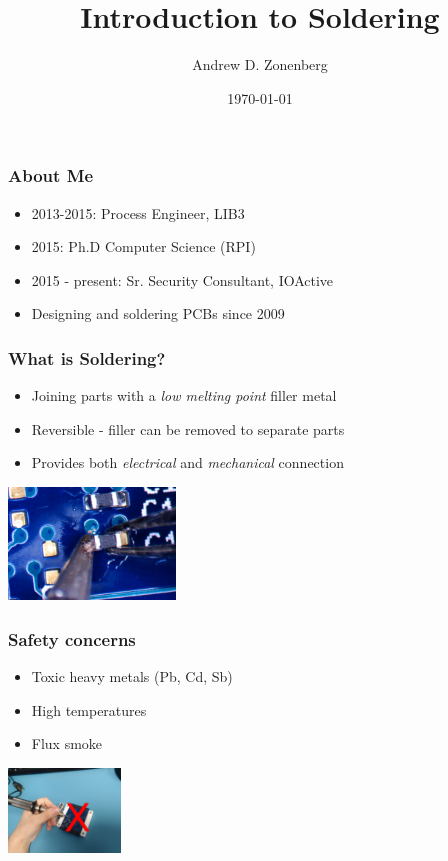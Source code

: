 \documentclass{beamer}
\title{Introduction to Soldering}
\author{Andrew D. Zonenberg}
\date{\today}
\begin{document}
\frame{\titlepage}

\begin{frame}
\frametitle{About Me}

\begin{itemize}
\item 2013-2015: Process Engineer, LIB3
\item 2015: Ph.D Computer Science (RPI)
\item 2015 - present: Sr. Security Consultant, IOActive
\item Designing and soldering PCBs since 2009
\end{itemize}
\end{frame}

\begin{frame}
\frametitle{What is Soldering?}
\begin{itemize}
\item Joining parts with a \emph{low melting point} filler metal
\item Reversible - filler can be removed to separate parts
\item Provides both \emph{electrical} and \emph{mechanical} connection
\end{itemize}
\begin{center}
\includegraphics[height=3cm,keepaspectratio]{intro-shot.jpg}
\end{center}
\end{frame}

\begin{frame}
\frametitle{Safety concerns}
\begin{itemize}
\item Toxic heavy metals (Pb, Cd, Sb)
\item High temperatures
\item Flux smoke
\end{itemize}
\begin{center}
\includegraphics[width=3cm,keepaspectratio]{safety.jpg}
\end{center}
\end{frame}
\end{document}
